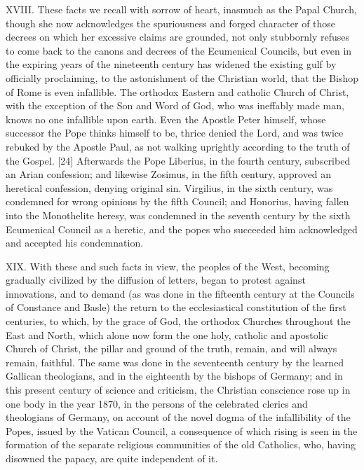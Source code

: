 XVIII. These facts we recall with sorrow of heart, inasmuch as the Papal
Church, though she now acknowledges the spuriousness and forged
character of those decrees on which her excessive claims are grounded,
not only stubbornly refuses to come back to the canons and decrees of
the Ecumenical Councils, but even in the expiring years of the
nineteenth century has widened the existing gulf by officially
proclaiming, to the astonishment of the Christian world, that the Bishop
of Rome is even infallible. The orthodox Eastern and catholic Church of
Christ, with the exception of the Son and Word of God, who was ineffably
made man, knows no one infallible upon earth. Even the Apostle Peter
himself, whose successor the Pope thinks himself to be, thrice denied
the Lord, and was twice rebuked by the Apostle Paul, as not walking
uprightly according to the truth of the Gospel. {[}24{]} Afterwards the
Pope Liberius, in the fourth century, subscribed an Arian confession;
and likewise Zosimus, in the fifth century, approved an heretical
confession, denying original sin. Virgilius, in the sixth century, was
condemned for wrong opinions by the fifth Council; and Honorius, having
fallen into the Monothelite heresy, was condemned in the seventh century
by the sixth Ecumenical Council as a heretic, and the popes who
succeeded him acknowledged and accepted his condemnation.

XIX. With these and such facts in view, the peoples of the West,
becoming gradually civilized by the diffusion of letters, began to
protest against innovations, and to demand (as was done in the fifteenth
century at the Councils of Constance and Basle) the return to the
ecclesiastical constitution of the first centuries, to which, by the
grace of God, the orthodox Churches throughout the East and North, which
alone now form the one holy, catholic and apostolic Church of Christ,
the pillar and ground of the truth, remain, and will always remain,
faithful. The same was done in the seventeenth century by the learned
Gallican theologians, and in the eighteenth by the bishops of Germany;
and in this present century of science and criticism, the Christian
conscience rose up in one body in the year 1870, in the persons of the
celebrated clerics and theologians of Germany, on account of the novel
dogma of the infallibility of the Popes, issued by the Vatican Council,
a consequence of which rising is seen in the formation of the separate
religious communities of the old Catholics, who, having disowned the
papacy, are quite independent of it.

